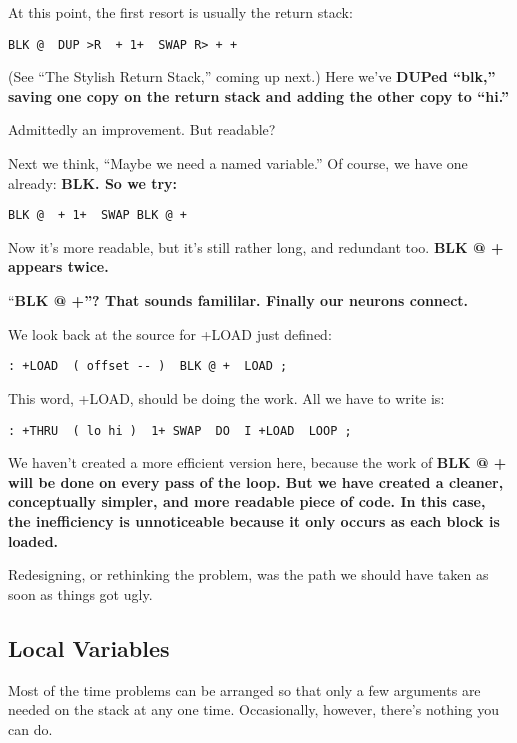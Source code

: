 At this point, the first resort is usually the return stack:

\begin{verbatim}
BLK @  DUP >R  + 1+  SWAP R> + +
\end{verbatim}

(See ``The Stylish Return Stack,'' coming up next.) Here we've \bf{DUP}ed
``blk,'' saving one copy on the return stack and adding the other copy to
``hi.''

Admittedly an improvement. But readable?

Next we think, ``Maybe we need a named variable.'' Of course, we
have one already: \bf{BLK}. So we try:

\begin{verbatim}
BLK @  + 1+  SWAP BLK @ +
\end{verbatim}

Now it's more readable, but it's still rather long, and redundant too.
\bf{BLK @ +} appears twice.

``\bf{BLK @ +}''? That sounds famililar. Finally our neurons connect.

We look back at the source for +LOAD just defined:

\begin{verbatim}
: +LOAD  ( offset -- )  BLK @ +  LOAD ;
\end{verbatim}

This word, +LOAD, should be doing the work. All we have to write is:

\begin{verbatim}
: +THRU  ( lo hi )  1+ SWAP  DO  I +LOAD  LOOP ;
\end{verbatim}

We haven't created a more efficient version here, because the work of
\bf{BLK @ +} will be done on every pass of the loop. But we have created a
cleaner, conceptually simpler, and more readable piece of code. In this
case, the inefficiency is unnoticeable because it only occurs as each block
is loaded.

Redesigning, or rethinking the problem, was the path we should
have taken as soon as things got ugly.

\subsection{Local Variables}

Most of the time problems can be arranged so that only a few arguments
are needed on the stack at any one time. Occasionally, however, there's
nothing you can do.


